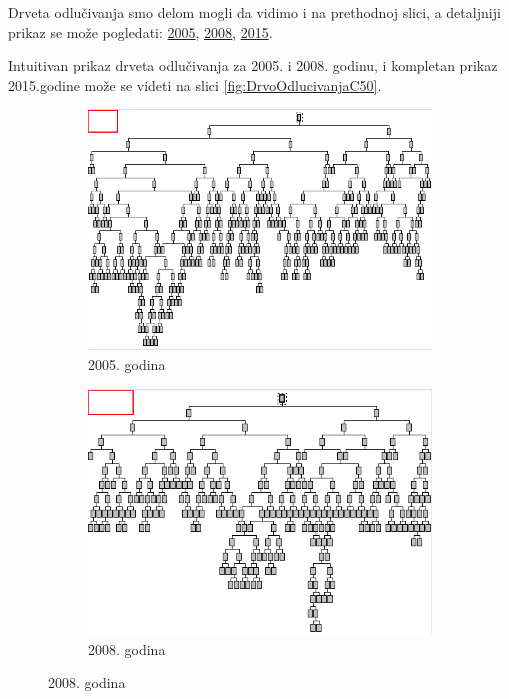 \documentclass[a4paper]{article}
\begin{document}
Drveta odlučivanja smo delom mogli da vidimo i na prethodnoj slici, a detaljniji prikaz se može pogledati: \href{file:./Klasifikacija/C50/Model_Surface2005.html}{2005}, \href{file:./Klasifikacija/C50/Model_Surface2008.html}{2008}, \href{file:./Klasifikacija/C50/Model_Surface2005.html}{2015}. 

Intuitivan prikaz drveta odlučivanja za 2005. i 2008. godinu, i kompletan prikaz 2015.godine može se videti na slici \ref{fig:DrvoOdlucivanjaC50}.

\begin{figure}[H]
	\begin{subfigure}[h]{\textwidth}
		\begin{center}
			\includegraphics[scale=0.35]{Klasifikacija/C50/MapaDrvetaOdlucivanja2005.png}
		\end{center}
		\caption{2005. godina}
		\label{fig:DrvoOdlucivanjaC502005}
	\end{subfigure}

	\vspace{0.5cm}
	\begin{subfigure}[h]{\textwidth}
		\begin{center}
			\includegraphics[scale=0.50]{Klasifikacija/C50/MapaDrvetaOdlucivanja2008.png}
		\end{center}
		\caption{2008. godina}
		\label{fig:DrvoOdlucivanjaC502008}
	\end{subfigure}
	

\end{figure}
\end{document}
